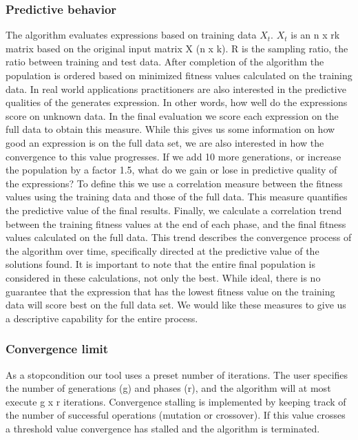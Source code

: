 \subsubsection{Predictive behavior}
The algorithm evaluates expressions based on training data $X_t$. $X_t$ is an n x rk matrix based on the original input matrix X (n x k).
R is the sampling ratio, the ratio between training and test data. 
After completion of the algorithm the population is ordered based on minimized fitness values calculated on the training data. 
In real world applications practitioners are also interested in the predictive qualities of the generates expression. In other words, how well do the expressions score on unknown data. In the final evaluation we score each expression on the full data to obtain this measure. 
While this gives us some information on how good an expression is on the full data set, we are also interested in how the convergence to this value progresses. 
If we add 10 more generations, or increase the population by a factor 1.5, what do we gain or lose in predictive quality of the expressions? 
To define this we use a correlation measure between the fitness values using the training data and those of the full data. 
This measure quantifies the predictive value of the final results.
Finally, we calculate a correlation trend between the training fitness values at the end of each phase, and the final fitness values calculated on the full data. This trend describes the convergence process of the algorithm over time, specifically directed at the predictive value of the solutions found. It is important to note that the entire final population is considered in these calculations, not only the best. While ideal, there is no guarantee that the expression that has the lowest fitness value on the training data will score best on the full data set. We would like these measures to give us a descriptive capability for the entire process.

\subsubsection{Convergence limit}
As a stopcondition our tool uses a preset number of iterations. The user specifies the number of generations (g) and phases (r), and the algorithm will at most execute g x r iterations. Convergence stalling is implemented by keeping track of the number of successful operations (mutation or crossover). If this value crosses a threshold value convergence has stalled and the algorithm is terminated.


